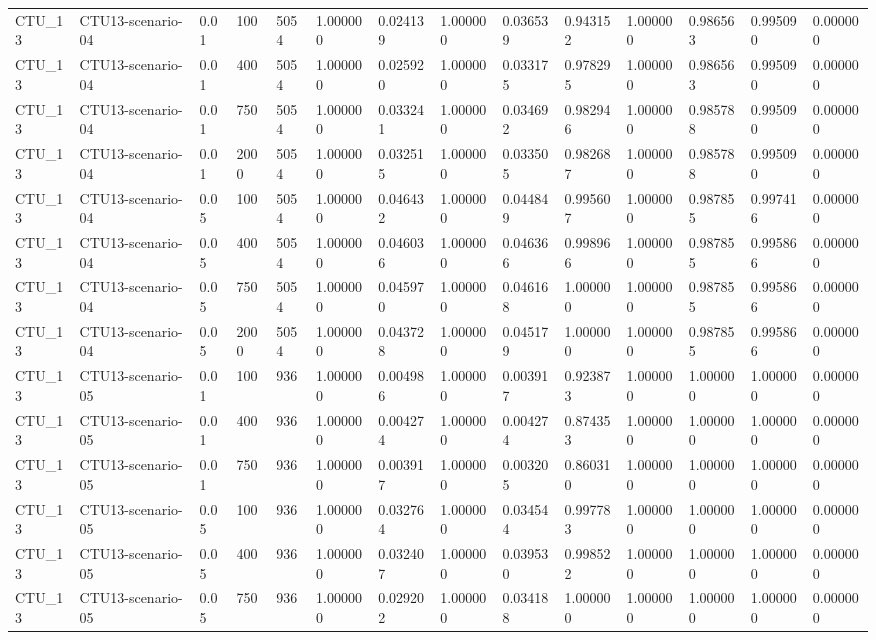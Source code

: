 \begin{tabular}{llllllllllllll}
CTU\_13 & CTU13-scenario-04 & 0.01 & 100 & 5054 & 1.000000 & 0.024139 & 1.000000 & 0.036539 & 0.943152 & 1.000000 & 0.986563 & 0.995090 & 0.000000 \\
CTU\_13 & CTU13-scenario-04 & 0.01 & 400 & 5054 & 1.000000 & 0.025920 & 1.000000 & 0.033175 & 0.978295 & 1.000000 & 0.986563 & 0.995090 & 0.000000 \\
CTU\_13 & CTU13-scenario-04 & 0.01 & 750 & 5054 & 1.000000 & 0.033241 & 1.000000 & 0.034692 & 0.982946 & 1.000000 & 0.985788 & 0.995090 & 0.000000 \\
CTU\_13 & CTU13-scenario-04 & 0.01 & 2000 & 5054 & 1.000000 & 0.032515 & 1.000000 & 0.033505 & 0.982687 & 1.000000 & 0.985788 & 0.995090 & 0.000000 \\
CTU\_13 & CTU13-scenario-04 & 0.05 & 100 & 5054 & 1.000000 & 0.046432 & 1.000000 & 0.044849 & 0.995607 & 1.000000 & 0.987855 & 0.997416 & 0.000000 \\
CTU\_13 & CTU13-scenario-04 & 0.05 & 400 & 5054 & 1.000000 & 0.046036 & 1.000000 & 0.046366 & 0.998966 & 1.000000 & 0.987855 & 0.995866 & 0.000000 \\
CTU\_13 & CTU13-scenario-04 & 0.05 & 750 & 5054 & 1.000000 & 0.045970 & 1.000000 & 0.046168 & 1.000000 & 1.000000 & 0.987855 & 0.995866 & 0.000000 \\
CTU\_13 & CTU13-scenario-04 & 0.05 & 2000 & 5054 & 1.000000 & 0.043728 & 1.000000 & 0.045179 & 1.000000 & 1.000000 & 0.987855 & 0.995866 & 0.000000 \\
CTU\_13 & CTU13-scenario-05 & 0.01 & 100 & 936 & 1.000000 & 0.004986 & 1.000000 & 0.003917 & 0.923873 & 1.000000 & 1.000000 & 1.000000 & 0.000000 \\
CTU\_13 & CTU13-scenario-05 & 0.01 & 400 & 936 & 1.000000 & 0.004274 & 1.000000 & 0.004274 & 0.874353 & 1.000000 & 1.000000 & 1.000000 & 0.000000 \\
CTU\_13 & CTU13-scenario-05 & 0.01 & 750 & 936 & 1.000000 & 0.003917 & 1.000000 & 0.003205 & 0.860310 & 1.000000 & 1.000000 & 1.000000 & 0.000000 \\
CTU\_13 & CTU13-scenario-05 & 0.05 & 100 & 936 & 1.000000 & 0.032764 & 1.000000 & 0.034544 & 0.997783 & 1.000000 & 1.000000 & 1.000000 & 0.000000 \\
CTU\_13 & CTU13-scenario-05 & 0.05 & 400 & 936 & 1.000000 & 0.032407 & 1.000000 & 0.039530 & 0.998522 & 1.000000 & 1.000000 & 1.000000 & 0.000000 \\
CTU\_13 & CTU13-scenario-05 & 0.05 & 750 & 936 & 1.000000 & 0.029202 & 1.000000 & 0.034188 & 1.000000 & 1.000000 & 1.000000 & 1.000000 & 0.000000 \\

\end{tabular}
